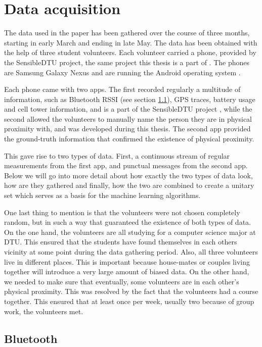 \chapter{Data acquisition}

The data used in the paper has been gathered over the course of three months, starting in early March and ending in late May. The data has been obtained with the help of three student volunteers. Each volunteer carried a phone, provided by the SensibleDTU project, the same project this thesis is a part of \cite{sensibledtu, Stopczynski}. The phones are Samsung Galaxy Nexus \cite{nexus} and are running the Android operating system \cite{android}.

Each phone came with two apps. The first recorded regularly a multitude of information, such as Bluetooth RSSI (see section \ref{sec:bt}), GPS traces, battery usage and cell tower information, and is a part of the SensibleDTU project \cite{Stopczynski}, while the second allowed the volunteers to manually name the person they are in physical proximity with, and was developed during this thesis. The second app provided the ground-truth information that confirmed the existence of physical proximity.

This gave rise to two types of data. First, a continuous stream of regular measurements from the first app, and punctual messages from the second app. Below we will go into more detail about how exactly the two types of data look, how are they gathered and finally, how the two are combined to create a unitary set which serves as a basis for the machine learning algorithms.

One last thing to mention is that the volunteers were not chosen completely random, but in such a way that guaranteed the existence of both types of data. On the one hand, the volunteers are all studying for a computer science major at DTU. This ensured that the students have found themselves in each others vicinity at some point during the data gathering period. Also, all three volunteers live in different places. This is important because house-mates or couples living together will introduce a very large amount of biased data.
On the other hand, we needed to make sure that eventually, some volunteers are in each other's physical proximity. This was resolved by the fact that the volunteers had a course together. This ensured that at least once per week, usually two because of group work, the volunteers met.

\section{Bluetooth}
\label{sec:bt}

